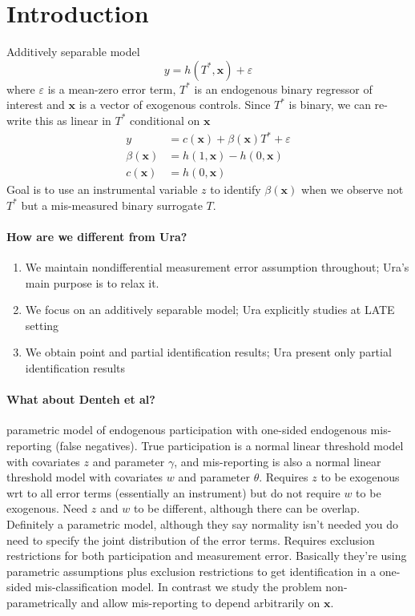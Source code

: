 \section{Introduction}
Additively separable model
\[
  y = h(T^*,\mathbf{x})+\varepsilon
\]
where $\varepsilon$ is a mean-zero error term, $T^*$ is an endogenous binary regressor of interest and $\mathbf{x}$ is a vector of exogenous controls.
Since $T^*$ is binary, we can re-write this as linear in $T^*$ conditional on $\mathbf{x}$
\begin{align*}
  y &= c(\mathbf{x}) + \beta(\mathbf{x}) T^* + \varepsilon\\
  \beta(\mathbf{x}) &= h(1,\mathbf{x}) - h(0,\mathbf{x})\\
  c(\mathbf{x}) &= h(0,\mathbf{x})
\end{align*}
Goal is to use an instrumental variable $z$ to identify $\beta(\mathbf{x})$ when we observe not $T^*$ but a mis-measured binary surrogate $T$. 

\paragraph{How are we different from Ura?}
\begin{enumerate}
  \item We maintain nondifferential measurement error assumption throughout; Ura's main purpose is to relax it.
  \item We focus on an additively separable model; Ura explicitly studies at LATE setting
  \item We obtain point and partial identification results; Ura present only partial identification results
\end{enumerate}

\paragraph{What about Denteh et al?}
\cite{nguimkeu2016estimation} parametric model of endogenous participation with one-sided endogenous mis-reporting (false negatives).
True participation is a normal linear threshold model with covariates $z$ and parameter $\gamma$, and mis-reporting is also a normal linear threshold model with covariates $w$ and parameter $\theta$.
Requires $z$ to be exogenous wrt to all error terms (essentially an instrument) but do not require $w$ to be exogenous.
Need $z$ and $w$ to be different, although there can be overlap.
Definitely a parametric model, although they say normality isn't needed you do need to specify the joint distribution of the error terms.
Requires exclusion restrictions for both participation and measurement error.
Basically they're using parametric assumptions plus exclusion restrictions to get identification in a one-sided mis-classification model.
In contrast we study the problem non-parametrically and allow mis-reporting to depend arbitrarily on $\mathbf{x}$.

